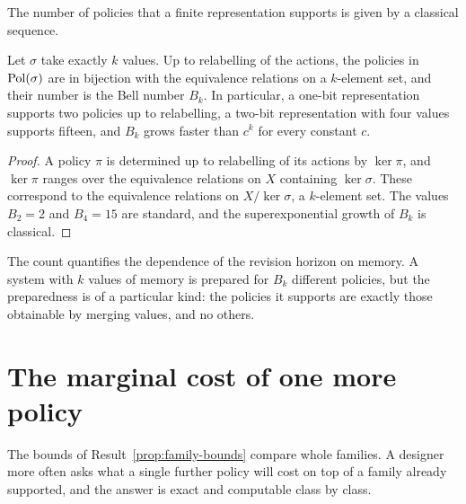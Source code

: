 The number of policies that a finite representation supports is given by a classical sequence.

\begin{established}\label{prop:bell}
Let $\sigma$ take exactly $k$ values. Up to relabelling of the actions, the policies in $\mathrm{Pol}(\sigma)$ are in bijection with the equivalence relations on a $k$-element set, and their number is the Bell number $B_k$. In particular, a one-bit representation supports two policies up to relabelling, a two-bit representation with four values supports fifteen, and $B_k$ grows faster than $c^{k}$ for every constant $c$.
\end{established}
\begin{proof}
A policy $\pi$ is determined up to relabelling of its actions by $\ker\pi$, and $\ker\pi$ ranges over the equivalence relations on $X$ containing $\ker\sigma$. These correspond to the equivalence relations on $X/{\ker\sigma}$, a $k$-element set. The values $B_2=2$ and $B_4=15$ are standard, and the superexponential growth of $B_k$ is classical.
\end{proof}

The count quantifies the dependence of the revision horizon on memory. A system with $k$ values of memory is prepared for $B_k$ different policies, but the preparedness is of a particular kind: the policies it supports are exactly those obtainable by merging values, and no others.


\section{The marginal cost of one more policy}\label{sec:marginal-policy}

The bounds of Result~\ref{prop:family-bounds} compare whole families. A designer more often asks what a single further policy will cost on top of a family already supported, and the answer is exact and computable class by class.

